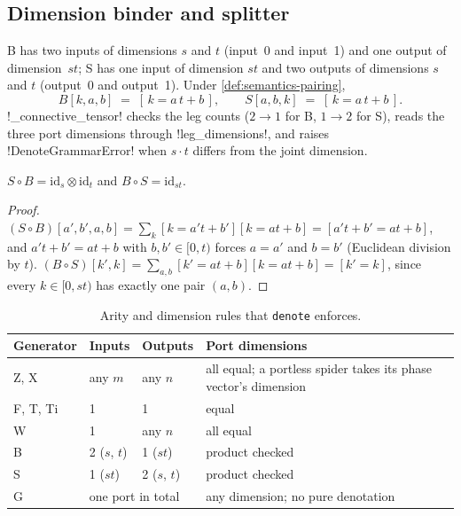 \subsection{Dimension binder and splitter}

\begin{definition}\label{def:semantics-bs}
B has two inputs of dimensions $s$ and $t$ (input~0 and input~1) and one output of dimension~$st$; S has one input of dimension $st$ and two outputs of dimensions $s$ and $t$ (output~0 and output~1). Under \cref{def:semantics-pairing},
\[
B[k,a,b] \;=\; [\,k=a\,t+b\,],\qquad S[a,b,k] \;=\; [\,k=a\,t+b\,].
\]
\py!_connective_tensor! checks the leg counts ($2\to1$ for B, $1\to2$ for S), reads the three port dimensions through \py!leg_dimensions!, and raises \py!DenoteGrammarError! when $s\cdot t$ differs from the joint dimension.
\end{definition}

\begin{proposition}\label{prop:semantics-bs-inverse}
$S\circ B=\mathrm{id}_s\otimes\mathrm{id}_t$ and $B\circ S=\mathrm{id}_{st}$.
\end{proposition}
\begin{proof}
$(S\circ B)[a',b',a,b]=\sum_{k}[k=a't+b'][k=at+b]=[a't+b'=at+b]$, and $a't+b'=at+b$ with $b,b'\in[0,t)$ forces $a=a'$ and $b=b'$ (Euclidean division by $t$). $(B\circ S)[k',k]=\sum_{a,b}[k'=at+b][k=at+b]=[k'=k]$, since every $k\in[0,st)$ has exactly one pair $(a,b)$.
\end{proof}

\begin{table}[H]
\centering\small
\begin{tabularx}{\linewidth}{@{}lllX@{}}
\toprule
Generator & Inputs & Outputs & Port dimensions \\
\midrule
Z, X & any $m$ & any $n$ & all equal; a portless spider takes its phase vector's dimension \\
F, T, Ti & 1 & 1 & equal \\
W & 1 & any $n$ & all equal \\
B & 2 ($s$, $t$) & 1 ($st$) & product checked \\
S & 1 ($st$) & 2 ($s$, $t$) & product checked \\
G & \multicolumn{2}{l}{one port in total} & any dimension; no pure denotation \\
\bottomrule
\end{tabularx}
\caption{Arity and dimension rules that \texttt{denote} enforces.}\label{tab:semantics-arity}
\end{table}

